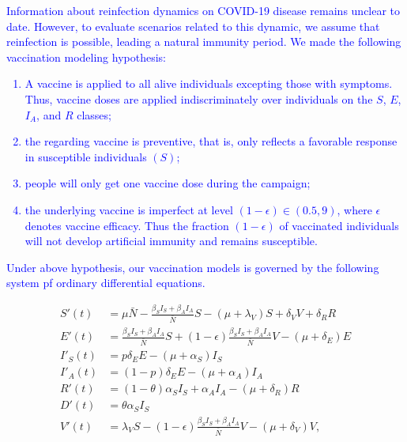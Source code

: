 \textcolor{blue}{
    Information about reinfection dynamics on COVID-19 disease
    remains unclear
to date. However, to evaluate scenarios related to this dynamic, we
assume
that reinfection is possible, leading a natural immunity period.
We made the following vaccination modeling hypothesis:
\begin{enumerate}[(H-1)]
    \item
        A vaccine is applied to
        all alive individuals excepting those with symptoms.
        Thus, vaccine doses are applied indiscriminately over
        individuals on
        the $S$, $E$, $I_A$, and $R$ classes;
    \item
        the regarding vaccine is preventive, that is,
        only reflects a favorable response in susceptible
        individuals
        $(S)$;
    \item
        people will only get one vaccine dose during the campaign;
    \item
        the underlying vaccine is imperfect at level
        $(1 -\epsilon) \in(0.5, 9)$, where $\epsilon$ denotes
        vaccine efficacy.
        Thus  the fraction $(1 -\epsilon)$ of  vaccinated
        individuals will not
        develop  artificial immunity and remains susceptible.
\end{enumerate}
Under above hypothesis, our vaccination models is governed by the
following
system pf ordinary differential equations.}
\begin{equation}
    \label{model1}
    \begin{aligned}
        S'(t) &=
            \mu \bar{N} - \frac{\beta_S I_S + \beta_AI_A}{\bar{N}}S
            - (\mu+\lambda_V) S
            + \delta_V V + \delta_R R
        \\
        E'(t)&=
            \frac{\beta_S I_S + \beta_AI_A}{\bar{N}}S
            + (1-\epsilon)
            \frac{\beta_S I_S + \beta_AI_A}{\bar{N}}V-(\mu+\delta_E)
            E \\
        I'_S(t)&=
            p \delta_E E
            -(\mu+\alpha_S) I_S
            \\
        I'_A(t)&=
            (1-p) \delta_E E
            -(\mu + \alpha_A) I_A
        \\
        R'(t)&=
            (1-\theta) \alpha_S I_S
            + \alpha_A I_A
            - (\mu+\delta_R) R
        \\
        D'(t)&=
            \theta \alpha_S I_S
        \\
        V'(t)&=
            \lambda_V S-(1-\epsilon)
            \frac{\beta_S I_S + \beta_A I_A}{\bar{N}}V
            - (\mu+\delta_V) V,
        \end{aligned}
    \end{equation}
